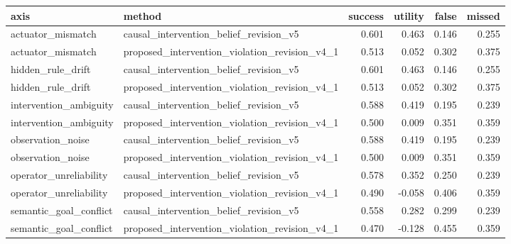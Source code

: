 \begin{tabular}{llrrrr}
\toprule
axis & method & success & utility & false & missed \\
\midrule
actuator\_mismatch & causal\_intervention\_belief\_revision\_v5 & 0.601 & 0.463 & 0.146 & 0.255 \\
actuator\_mismatch & proposed\_intervention\_violation\_revision\_v4\_1 & 0.513 & 0.052 & 0.302 & 0.375 \\
hidden\_rule\_drift & causal\_intervention\_belief\_revision\_v5 & 0.601 & 0.463 & 0.146 & 0.255 \\
hidden\_rule\_drift & proposed\_intervention\_violation\_revision\_v4\_1 & 0.513 & 0.052 & 0.302 & 0.375 \\
intervention\_ambiguity & causal\_intervention\_belief\_revision\_v5 & 0.588 & 0.419 & 0.195 & 0.239 \\
intervention\_ambiguity & proposed\_intervention\_violation\_revision\_v4\_1 & 0.500 & 0.009 & 0.351 & 0.359 \\
observation\_noise & causal\_intervention\_belief\_revision\_v5 & 0.588 & 0.419 & 0.195 & 0.239 \\
observation\_noise & proposed\_intervention\_violation\_revision\_v4\_1 & 0.500 & 0.009 & 0.351 & 0.359 \\
operator\_unreliability & causal\_intervention\_belief\_revision\_v5 & 0.578 & 0.352 & 0.250 & 0.239 \\
operator\_unreliability & proposed\_intervention\_violation\_revision\_v4\_1 & 0.490 & -0.058 & 0.406 & 0.359 \\
semantic\_goal\_conflict & causal\_intervention\_belief\_revision\_v5 & 0.558 & 0.282 & 0.299 & 0.239 \\
semantic\_goal\_conflict & proposed\_intervention\_violation\_revision\_v4\_1 & 0.470 & -0.128 & 0.455 & 0.359 \\
\bottomrule
\end{tabular}
